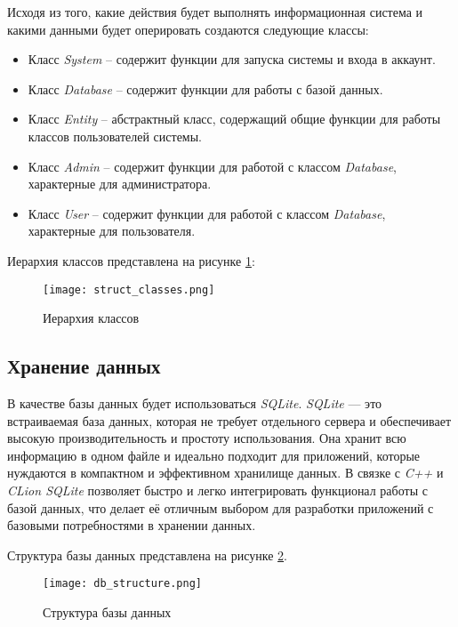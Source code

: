 Исходя из того, какие действия будет выполнять информационная система и какими данными будет оперировать создаются следующие классы:

\begin{itemize}
    \item Класс \textit{System} -- содержит функции для запуска системы и входа в аккаунт.
    \item Класс \textit{Database} -- содержит функции для работы с базой данных.
    \item Класс \textit{Entity} -- абстрактный класс, содержащий общие функции для работы классов пользователей системы.
    \item Класс \textit{Admin} -- содержит функции для работой с классом \textit{Database}, характерные для администратора.
    \item Класс \textit{User} -- содержит функции для работой с классом \textit{Database}, характерные для пользователя.
\end{itemize}

Иерархия классов представлена на рисунке \ref{fig:struct_classes}:

\begin{figure}[h]
    \centering
    \texttt{[image: struct\_classes.png]}
    \caption{Иерархия классов}
    \label{fig:struct_classes}
\end{figure}


\subsection{Хранение данных}

В качестве базы данных будет использоваться \textit{SQLite}. \textit{SQLite} — это встраиваемая база данных, которая не требует отдельного сервера и обеспечивает высокую производительность и простоту использования. Она хранит всю информацию в одном файле и идеально подходит для приложений, которые нуждаются в компактном и эффективном хранилище данных. В связке с \textit{C++} и \textit{CLion SQLite} позволяет быстро и легко интегрировать функционал работы с базой данных, что делает её отличным выбором для разработки приложений с базовыми потребностями в хранении данных.

Структура базы данных представлена на рисунке \ref{fig:struct_db}.\\

\begin{figure}[h]
    \centering
    \texttt{[image: db\_structure.png]}
    \caption{Структура базы данных}
    \label{fig:struct_db}
  \end{figure}

